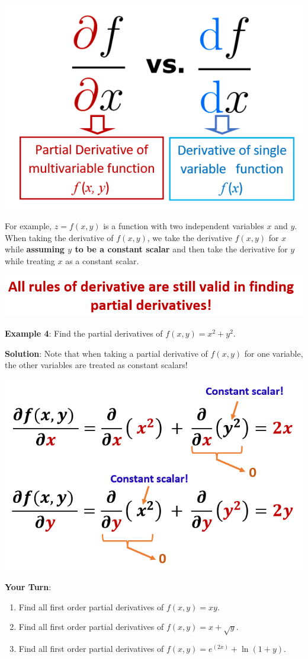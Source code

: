 \documentclass[
]{book}
\begin{document}
\begin{center}\includegraphics[width=0.3\linewidth]{img13/w13-partialDerivativeNotation} \end{center}

For example, \(z = f(x, y)\) is a function with two independent variables \(x\) and \(y\). When taking the derivative of \(f(x,y)\), we take the derivative \(f(x,y)\) for \(x\) while \textbf{\color{red}assuming \(y\) to be a constant scalar} and then take the derivative for \(y\) while treating \(x\) as a constant scalar.

\hfill\break

\begin{center}\includegraphics[width=0.6\linewidth]{img13/w13-allRulesAreValid} \end{center}

\hfill\break

\textbf{Example 4}: Find the partial derivatives of \(f(x,y) = x^2 + y^2\).

\textbf{Solution}: Note that when taking a partial derivative of \(f(x,y)\) for one variable, the other variables are treated as constant scalars!

\begin{center}\includegraphics[width=0.6\linewidth]{img13/w13-PartialExampleSol} \end{center}

\hfill\break

\textbf{Your Turn}:

\begin{enumerate}
\def\labelenumi{\arabic{enumi}.}
\item
  Find all first order partial derivatives of \(f(x,y) = xy\).
\item
  Find all first order partial derivatives of \(f(x,y) = x+\sqrt{y}\).
\item
  Find all first order partial derivatives of \(f(x,y) = e^(2x)+ \ln(1+y)\).
\end{enumerate}
\end{document}
